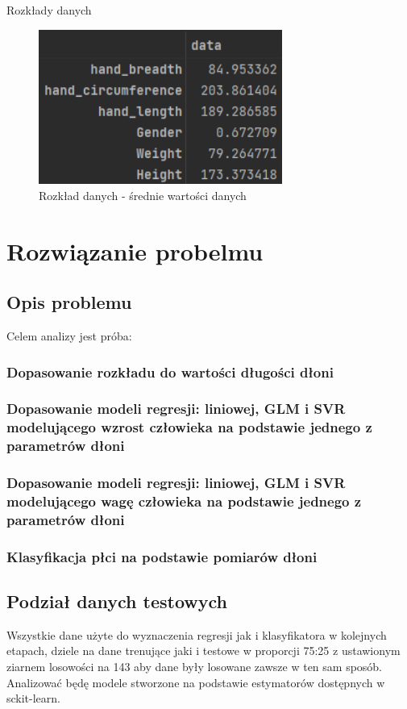 \documentclass{article}
\begin{document}
\begin{subsection} {Rozkłady danych}
\begin{figure}[H]
    \centering
    \includegraphics[width=8cm]{srednie_dane.png}
    \caption{Rozkład danych - średnie wartości danych}
    \label{fig:my_img}
\end{figure}
\end{subsection}


\newpage
\section{Rozwiązanie probelmu}
\subsection{Opis problemu}
Celem analizy jest próba:

\subsubsection{Dopasowanie rozkładu do wartości długości dłoni}
\subsubsection{Dopasowanie modeli regresji: liniowej, GLM i SVR modelującego wzrost człowieka na podstawie jednego z parametrów dłoni}
\subsubsection{Dopasowanie modeli regresji: liniowej, GLM i SVR modelującego wagę człowieka na podstawie jednego z parametrów dłoni}
\subsubsection{Klasyfikacja płci na podstawie pomiarów dłoni}

\subsection{Podział danych testowych}
Wszystkie dane użyte do wyznaczenia regresji jak i klasyfikatora w kolejnych etapach, dziele na dane trenujące jaki i testowe w proporcji 75:25 z ustawionym ziarnem losowości na 143 aby dane były losowane zawsze w ten sam sposób. Analizować będę modele stworzone na podstawie estymatorów dostępnych w sckit-learn.
\end{document}
